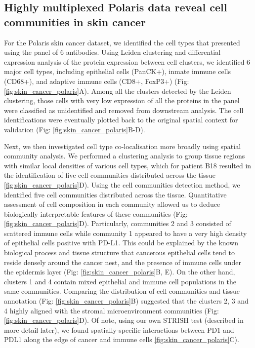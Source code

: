 \subsection{Highly multiplexed Polaris data reveal cell communities in skin cancer}
For the Polaris skin cancer dataset, we identified the cell types that presented using the panel of 6 antibodies. Using Leiden clustering and differential expression analysis of the protein expression between cell clusters, we identified 6 major cell types, including epithelial cells (PanCK+), inmate immune cells (CD68+), and adaptive immune cells (CD8+, FoxP3+) (Fig: \ref{fig:skin_cancer_polaris}A). Among all the clusters detected by the Leiden clustering, those cells with very low expression of all the proteins in the panel were classified as unidentified and removed from downstream analysis. The cell identifications were eventually plotted back to the original spatial context for validation (Fig: \ref{fig:skin_cancer_polaris}B-D).  

Next, we then investigated cell type co-localisation more broadly using spatial community analysis. We performed a clustering analysis to group tissue regions with similar local densities of various cell types, which for patient B18 resulted in the identification of five cell communities distributed across the tissue \ref{fig:skin_cancer_polaris}D). Using the cell communities detection method, we identified five cell communities distributed across the tissue. Quantitative assessment of cell composition in each community allowed us to deduce biologically interpretable features of these communities (Fig: \ref{fig:skin_cancer_polaris}D). Particularly, communities 2 and 3 consisted of scattered immune cells while community 1 appeared to have a very high density of epithelial cells positive with PD-L1. This could be explained by the known biological process and tissue structure that cancerous epithelial cells tend to reside densely around the cancer nest, and the presence of immune cells under the epidermis layer (Fig: \ref{fig:skin_cancer_polaris}B, E). On the other hand, clusters 1 and 4 contain mixed epithelial and immune cell populations in the same communities. Comparing the distribution of cell communities and tissue annotation (Fig: \ref{fig:skin_cancer_polaris}B) suggested that the clusters 2, 3 and 4 highly aligned with the stromal microenvironment communities (Fig: \ref{fig:skin_cancer_polaris}D).  Of note, using our own STRISH test (described in more detail later), we found spatially-specific interactions between PD1 and PDL1 along the edge of cancer and immune cells \ref{fig:skin_cancer_polaris}C).



